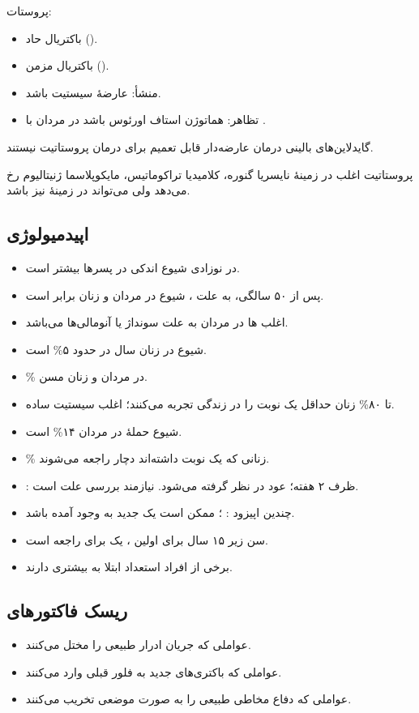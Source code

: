 پروستات:
\begin{itemize}
\item باکتریال حاد ().
\item باکتریال مزمن ().
\item منشأ: عارضهٔ سیستیت باشد.
\item تظاهر: هماتوژن استاف اورئوس باشد در مردان با .
\end{itemize}

گایدلاین‌های بالینی درمان  عارضه‌دار قابل تعمیم برای درمان پروستاتیت نیستند.

پروستاتیت اغلب در زمینهٔ نایسریا گنوره، کلامیدیا تراکوماتیس، مایکوپلاسما ژنیتالیوم رخ می‌دهد ولی می‌تواند در زمینهٔ  نیز باشد.

\subsection*{اپیدمیولوژی}
\begin{itemize}
\item در نوزادی شیوع  اندکی در پسرها بیشتر است.
\item پس از ۵۰ سالگی، به علت ، شیوع  در مردان و زنان برابر است.
\item اغلب ها در مردان به علت سونداژ یا آنومالی‌ها می‌باشد.
\item شیوع  در زنان  سال در حدود ۵\% است.
\item {}\% در مردان و زنان مسن.
\item تا ۸۰\% زنان حداقل یک نوبت  را در زندگی تجربه می‌کنند؛ اغلب سیستیت ساده.
\item شیوع حملهٔ  در مردان ۱۴\% است.
\item {}\% زنانی که یک نوبت  داشته‌اند دچار  راجعه می‌شوند.
\item {}: ظرف ۲ هفته؛ عود در نظر گرفته می‌شود. نیازمند بررسی علت است.
\item چندین اپیزود : ؛ ممکن است یک  جدید به وجود آمده باشد.
\item سن زیر ۱۵ سال برای اولین ، یک  برای  راجعه است.
\item برخی از افراد استعداد ابتلا به  بیشتری دارند.
\end{itemize}

\subsection*{ریسک فاکتورهای }
\begin{itemize}
\item عواملی که جریان ادرار طبیعی را مختل می‌کنند.
\item عواملی که باکتری‌های جدید به فلور قبلی وارد می‌کنند.
\item عواملی که دفاع مخاطی طبیعی را به صورت موضعی تخریب می‌کنند.
\end{itemize}

